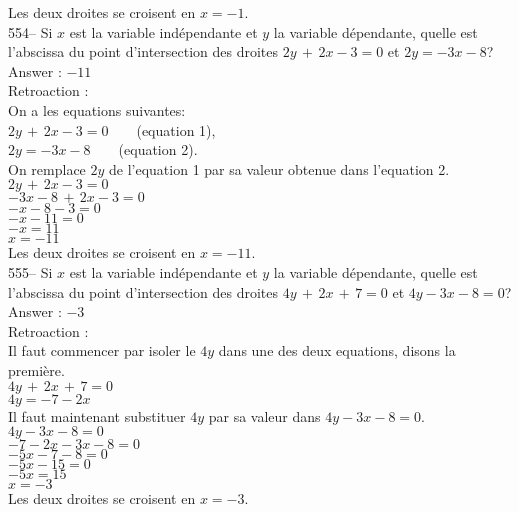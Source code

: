 ﻿\documentclass[letterpaper, 12pt]{article}
\begin{document}
Les deux droites se croisent en $x=-1$.\\

554-- Si $x$ est la variable ind\'ependante et $y$ la variable d\'ependante,
quelle est l'abscissa du point d'intersection des droites $2y\,+\,2x-3=0$ et
$2y=-3x-8$?\\

Answer : $-11$\\

Retroaction : \\
On a les equations suivantes:\\
$2y\,+\,2x-3=0  \qquad $(equation 1),\\
$2y=-3x-8  \qquad $(equation 2).\\

On remplace $2y$ de l'equation 1 par sa valeur obtenue dans l'equation
2.\\
$2y\,+\,2x-3=0$\\
$-3x-8\,+\,2x-3=0$\\
$-x-8-3=0$\\
$-x-11=0$\\
$-x=11$\\
$x=-11$\\
Les deux droites se croisent en $x=-11$.\\

555-- Si $x$ est la variable ind\'ependante et $y$ la variable d\'ependante,
quelle est l'abscissa du point d'intersection des droites
$4y\,+\,2x\,+\,7=0$ et $4y-3x-8=0$?\\

Answer : $-3$\\

Retroaction : \\
Il faut commencer par isoler le $4y$ dans une des deux equations, disons
la premi\`ere.\\
$4y\,+\,2x\,+\,7=0$\\
$4y=-7-2x$\\

Il faut maintenant substituer $4y$ par sa valeur dans $4y-3x-8=0$.\\
$4y-3x-8=0$\\
$-7-2x-3x-8=0$\\
$-5x-7-8=0$\\
$-5x-15=0$\\
$-5x=15$\\
$x=-3$\\
Les deux droites se croisent en $x=-3$.\\
\end{document}
